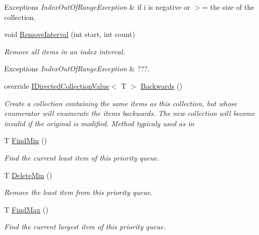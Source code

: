 \begin{DoxyCompactItemize}
\begin{DoxyCompactList}
\begin{DoxyExceptions}{Exceptions}
{\em Index\+Out\+Of\+Range\+Exception} & if i is negative or $>$= the size of the collection. \\
\hline
\end{DoxyExceptions}
\end{DoxyCompactList}\item 
void \hyperlink{class_c5_1_1_tree_set_a23b614ca0fa47fa4971088c40998bf5e}{Remove\+Interval} (int start, int count)
\begin{DoxyCompactList}\small\item\em Remove all items in an index interval. 
\begin{DoxyExceptions}{Exceptions}
{\em Index\+Out\+Of\+Range\+Exception} & ???. \\
\hline
\end{DoxyExceptions}
\end{DoxyCompactList}\item 
override \hyperlink{interface_c5_1_1_i_directed_collection_value}{I\+Directed\+Collection\+Value}$<$ T $>$ \hyperlink{class_c5_1_1_tree_set_a27bc1208dc4fb8e7e1e3be048354ec7b}{Backwards} ()
\begin{DoxyCompactList}\small\item\em Create a collection containing the same items as this collection, but whose enumerator will enumerate the items backwards. The new collection will become invalid if the original is modified. Method typicaly used as in \end{DoxyCompactList}\item 
T \hyperlink{class_c5_1_1_tree_set_aae32ac970e89acfba84ebab15612295c}{Find\+Min} ()
\begin{DoxyCompactList}\small\item\em Find the current least item of this priority queue. \end{DoxyCompactList}\item 
T \hyperlink{class_c5_1_1_tree_set_ae64fd01cde0d44fb7aa465653f8ca691}{Delete\+Min} ()
\begin{DoxyCompactList}\small\item\em Remove the least item from this priority queue. \end{DoxyCompactList}\item 
T \hyperlink{class_c5_1_1_tree_set_a05966d4907a457e68f5bf5743658ef12}{Find\+Max} ()
\begin{DoxyCompactList}\small\item\em Find the current largest item of this priority queue. \end{DoxyCompactList}\item 

\end{DoxyCompactItemize}
